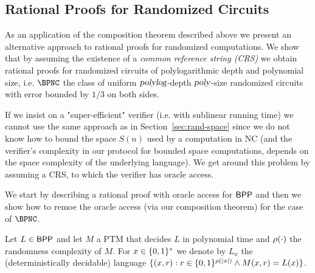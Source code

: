 


\subsection{Rational Proofs for Randomized Circuits}
\label{sec:bpnc}

As an application of the composition theorem described above we present an alternative approach to rational proofs for randomized computations. We show that by assuming the existence
of a {\em common reference string (CRS)} we obtain rational proofs for randomized circuits of polylogarithmic depth and polynomial size, i.e. $\BPNC$ the class of uniform ${\textsl{polylog}}$-depth ${\textsl{poly}}$-size randomized circuits with error bounded by $1/3$ on both sides.

If we insist on a "super-efficient" verifier (i.e. with sublinear running time) we cannot
use the same approach as in Section~\ref{sec:rand-space} since we do not know
how to bound the space $S(n)$ used by a computation in NC (and the verifier's 
complexity in our protocol for bounded space computations, depends on the 
space complexity of the underlying language).  We get around this problem by assuming a CRS, to which the verifier has oracle access. 


We start by describing a rational proof with oracle access for ${\mathsf{BPP}}$ and then we show how to remoe the oracle access (via our composition theorem) for the case of 
$\BPNC$. 

Let $L \in {\ensuremath{\mathsf{BPP}}}$ and let $M$ a PTM that decides $L$ in polynomial time and $\rho(\cdot)$ the
randomness complexity of $M$.
For $x \in \{0, 1\}^{*}$ we denote by $L_x$ the (deterministically
decidable) language $\{(x, r) : r \in \{0, 1\}^{ \rho(|x|)} \wedge M (x, r) = L(x)\}$.

